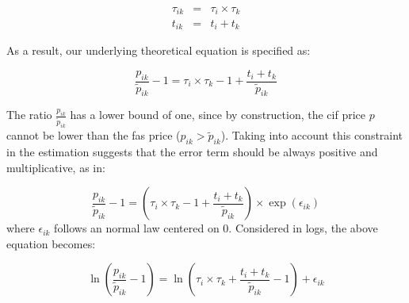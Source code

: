 \documentclass[a4paper,11pt]{article}
\begin{document}
\begin{eqnarray}
\tau_{ik} &=& \tau_{i} \times \tau_{k} \label{eq:ad-valorem}\\
t_{ik} &=& t_{i} + t_{k} \label{eq:add}
\end{eqnarray}

\noindent As a result, our underlying theoretical equation is specified as:

\begin{equation*}
\frac{p_{ik}}{\widetilde{p}_{ik}}-1 =\tau_{i} \times \tau_{k} -1 +\frac{t_{i} + t_{k}}{ \widetilde{p}_{ik}} \label{eq:theory_equation}
\end{equation*}

The ratio $\frac{p_{ik}}{\widetilde{p}_{ik}}$ has a lower bound of one, since by construction, the cif price $p$ cannot be lower than the fas price ($p_{ik}>\widetilde{p}_{ik}$). Taking into account this constraint in the estimation suggests that the error term should be always positive and multiplicative, as in:

\begin{equation*}
\frac{p_{ik}}{\widetilde{p}_{ik}}-1 =\left(\tau_{i} \times \tau_{k} -1+\frac{t_{i} + t_{k}}{\widetilde{p}_{ik}} \right)\times \exp(\epsilon_{ik})
\end{equation*}
\noindent where $\epsilon_{ik}$ follows an normal law centered on 0. Considered in logs, the above equation becomes:

\begin{equation}
\ln\left(\frac{p_{ik}}{\widetilde{p}_{ik}}-1 \right)= \ln \left(\tau_{i} \times \tau_{k}+\frac{t_{i} + t_{k}}{\widetilde{p}_{ik}}-1 \right) + \epsilon_{ik} \label{eq:equation0}
\end{equation}
\end{document}

